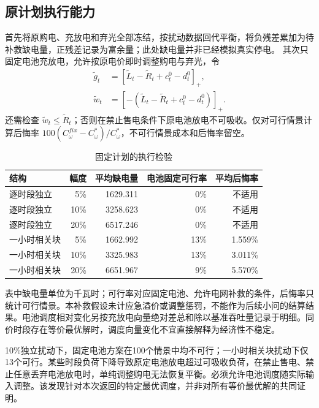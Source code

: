 \subsection{原计划执行能力}
首先将原购电、充放电和弃光全部冻结，按扰动数据回代平衡，将负残差累加为待补救缺电量，正残差记录为富余量；此处缺电量并非已经模拟真实停电。
其次只固定电池充放电，允许按原电价即时调整购电与弃光，令
\begin{align}
\widetilde g_t&=[\widetilde L_t-\widetilde R_t+c_t^0-d_t^0]_+,\\
\widetilde w_t&=[-(\widetilde L_t-\widetilde R_t+c_t^0-d_t^0)]_+.
\end{align}
还需检查 $\widetilde w_t\le\widetilde R_t$；否则在禁止售电条件下原电池放电不可吸收。仅对可行情景计算后悔率 $100(C_\omega^{fix}-C_\omega^*)/C_\omega^*$，不可行情景成本和后悔率留空。
\begin{table}[htbp]
\centering\small
\caption{固定计划的执行检验}
\begin{tabular}{lrrrr}
\toprule
结构 & 幅度 & 平均缺电量 & 电池固定可行率 & 平均后悔率\\
\midrule
逐时段独立 & 5\% & 1629.311 & 0\% & 不适用\\
逐时段独立 & 10\% & 3258.623 & 0\% & 不适用\\
逐时段独立 & 20\% & 6517.246 & 0\% & 不适用\\
一小时相关块 & 5\% & 1662.992 & 13\% & 1.559\%\\
一小时相关块 & 10\% & 3325.983 & 13\% & 3.011\%\\
一小时相关块 & 20\% & 6651.967 & 9\% & 5.570\%\\
\bottomrule
\end{tabular}
\end{table}
表中缺电量单位为千瓦时；可行率对应固定电池、允许电网补救的条件，后悔率只统计可行情景。本补救假设未计应急溢价或调整惩罚，不能作为后续小问的结算结果。电池调度相对变化另按充放电向量绝对差总和除以基准吞吐量记录于明细。同价时段存在等价最优解时，调度向量变化不宜直接解释为经济性不稳定。

10\%独立扰动下，固定电池方案在100个情景中均不可行；一小时相关块扰动下仅13个可行。某些时段负荷下降导致原定电池放电超过可吸收负荷，在禁止售电、禁止任意丢弃电池放电时，单纯调整购电无法恢复平衡。必须允许电池调度随实际输入调整。该发现针对本次返回的特定最优调度，并非对所有等价最优解的共同证明。

